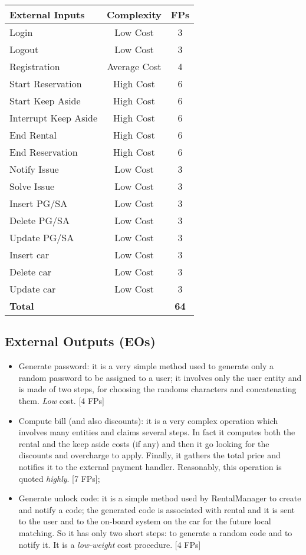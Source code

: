 \documentclass{scrreprt}
\begin{document}
\begin{center}
\begin{tabular}{lcc}
\toprule \textbf{External Inputs}&\textbf{Complexity}&\textbf{FPs}\\ \midrule
Login & Low Cost & 3\\ 
Logout & Low Cost & 3\\ 
Registration & Average Cost & 4\\ 
Start Reservation & High Cost & 6\\ 
Start Keep Aside & High Cost &  6\\ 
Interrupt Keep Aside & High Cost & 6\\ 
End Rental & High Cost & 6\\ 
End Reservation & High Cost & 6\\ 
Notify Issue & Low Cost & 3\\ 
Solve Issue & Low Cost & 3\\ 
Insert PG/SA & Low Cost & 3\\ 
Delete PG/SA & Low Cost & 3\\ 
Update PG/SA & Low Cost & 3\\ 
Insert car & Low Cost & 3\\ 
Delete car & Low Cost & 3\\ 
Update car & Low Cost & 3\\ \midrule
\textbf{Total}&&\textbf{64}\\
\bottomrule
\end{tabular}
\end{center}

\subsection{External Outputs (EOs)}

\begin{itemize}
\item Generate password: it is a very simple method used to generate only a random password to be assigned to a user; it involves only the user entity and is made of two steps, for choosing the randoms characters and concatenating them. \emph{Low} cost. [4 FPs]

\item Compute bill (and also discounts): it is a very complex operation which involves many entities and claims several steps. In fact it computes both the rental and the keep aside costs (if any) and then it go looking for the discounts and overcharge to apply. Finally, it gathers the total price and notifies it to the external payment handler.
Reasonably, this operation is quoted \emph{highly}. [7 FPs];

\item Generate unlock code: it is a simple method used by RentalManager to create and notify a code; the generated code is associated with rental and it is sent to the user and to the on-board system on the car for the future local matching. So it has only two short steps: to generate a random code and to notify it. It is a \emph{low-weight} cost procedure. [4 FPs]

\end{itemize}
\end{document}
